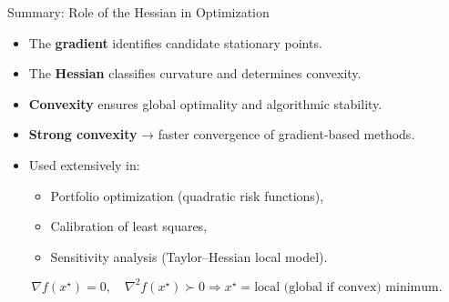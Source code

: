 \documentclass[aspectratio=169]{beamer}
\begin{document}
\begin{frame}{Summary: Role of the Hessian in Optimization}

\begin{itemize}
  \item The \textbf{gradient} identifies candidate stationary points.
  \item The \textbf{Hessian} classifies curvature and determines convexity.
  \item \textbf{Convexity} ensures global optimality and algorithmic stability.
  \item \textbf{Strong convexity} → faster convergence of gradient-based methods.
  \item Used extensively in:
    \begin{itemize}
      \item Portfolio optimization (quadratic risk functions),
      \item Calibration of least squares,
      \item Sensitivity analysis (Taylor–Hessian local model).
    \end{itemize}
\end{itemize}

\[
\boxed{
\nabla f(x^\star)=0,\quad
\nabla^2 f(x^\star)\succ 0
\Rightarrow
x^\star=\text{local (global if convex) minimum.}
}
\]

\end{frame}
\end{document}
